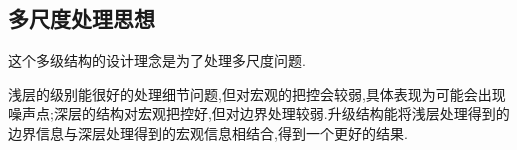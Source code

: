 \subsection{多尺度处理思想}
这个多级结构的设计理念是为了处理多尺度问题.
\par
浅层的级别能很好的处理细节问题,但对宏观的把控会较弱,具体表现为可能会出现噪声点;深层的结构对宏观把控好,但对边界处理较弱.升级结构能将浅层处理得到的边界信息与深层处理得到的宏观信息相结合,得到一个更好的结果.